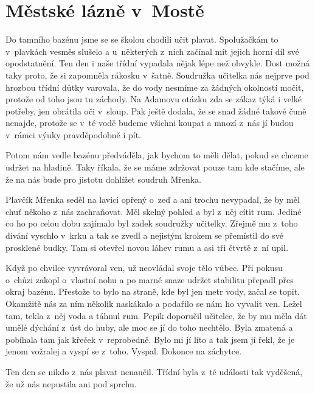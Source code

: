 
\chapter{Městské lázně v~Mostě}

Do tamního bazénu jsme se se školou chodili učit plavat. Spolužačkám to
v~plavkách vesměs slušelo a u~některých z~nich začínal mít jejich horní díl své
opodstatnění. Ten den i naše třídní vypadala nějak lépe než obvykle. Dost možná
taky proto, že si zapomněla rákosku v~šatně. Soudružka učitelka nás nejprve pod
hrozbou třídní důtky varovala, že do vody nesmíme za žádných okolností močit,
protože od toho jsou tu záchody. Na Adamovu otázku zda se zákaz týká i velké
potřeby, jen obrátila oči v~sloup. Pak ještě dodala, že se snad žádné takové
čuně nenajde, protože se v~té vodě budeme všichni koupat a mnozí z~nás jí budou
v~rámci výuky pravděpodobně i pít.

Potom nám vedle bazénu předváděla, jak bychom to měli dělat, pokud se chceme
udržet na hladině. Taky říkala, že se máme zdržovat pouze tam kde stačíme, ale
že na nás bude pro jistotu dohlížet soudruh Mřenka.

Plavčík Mřenka seděl na lavici opřený o~zeď a ani trochu nevypadal, že by měl
chuť někoho z~nás zachraňovat. Měl skelný pohled a byl z~něj cítit rum. Jediné
co ho po celou dobu zajímalo byl zadek soudružky učitelky. Zřejmě mu z~toho
dívání vyschlo v~krku a tak se zvedl a nejistým krokem se přemístil do své
prosklené budky. Tam si otevřel novou láhev rumu a asi tři čtvrtě z~ní upil.

Když po chvilce vyvrávoral ven, už neovládal svoje tělo vůbec. Při pokusu
o~chůzi zakopl o~vlastní nohu a po marné snaze udržet stabilitu přepadl přes
okraj bazénu. Přestože to bylo na straně, kde byl jen metr vody, začal se topit.
Okamžitě nás za ním několik naskákalo a podařilo se nám ho vyvalit ven. Ležel
tam, tekla z~něj voda a táhnul rum. Pepík doporučil učitelce, že by mu měla dát
umělé dýchání z~úst do huby, ale moc se jí do toho nechtělo. Byla zmatená a
pobíhala tam jak křeček v~reprobedně. Bylo mi jí líto a tak jsem jí řekl, že je
jenom vožralej a vyspí se z~toho. Vyspal. Dokonce na záchytce.

Ten den se nikdo z~nás plavat nenaučil. Třídní byla z~té události tak vyděšená,
že už nás nepustila ani pod sprchu.

